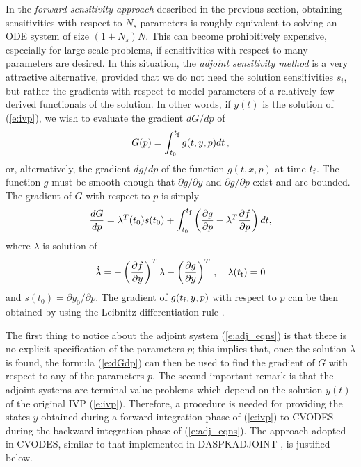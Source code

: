 In the {\em forward sensitivity approach} described in the previous
section, obtaining sensitivities with respect to $N_s$ parameters is roughly
equivalent to solving an ODE system of size $(1+N_s) N$. This can become 
prohibitively expensive, especially for large-scale problems, if sensitivities
with respect to many parameters are desired.
In this situation, the {\em adjoint sensitivity method} is a very
attractive alternative, provided that we do not need the solution sensitivities
$s_i$, but rather the gradients with respect to model parameters of a relatively 
few derived functionals of the solution. In other words, if $y(t)$ is the solution
of (\ref{e:ivp}), we wish to evaluate the gradient ${dG}/{dp}$ of
\begin{equation}\label{e:G}
G(p) = \int_{t_0}^{t_\mb{f}} g(t, y, p) dt \, ,
\end{equation}
or, alternatively, the gradient ${dg}/{dp}$ of the function $g(t, x, p)$ 
at time $t_\mb{f}$. 
The function $g$ must be smooth enough that $\partial g / \partial y$ 
and $\partial g / \partial p$ exist and are bounded. 
%
The gradient of $G$ with respect to $p$ is simply
\begin{equation}\label{e:dGdp}
  \frac{dG}{dp} = \lambda^T(t_0) s(t_0) + 
  \int_{t_0}^{t_\mb{f}} \left( \frac{\partial g}{\partial p} + 
    \lambda^T \frac{\partial f}{\partial p} \right) dt,
\end{equation}
where $\lambda$ is solution of
\begin{equation}\label{e:adj_eqns}
{\dot \lambda} = -\left( \dfdy \right)^T \lambda - 
\left( \frac{\partial g}{\partial y} \right)^T \, ,
\quad \lambda(t_\mb{f}) = 0
\end{equation}
and $s(t_0) = \partial y_0 / \partial p$.
%
The gradient of $g(t_\mb{f},y,p)$ with respect to $p$ can be then obtained
by using the Leibnitz differentiation rule \cite{CLPS:03}.

The first thing to notice about the adjoint system (\ref{e:adj_eqns})
is that there is no explicit specification of the parameters $p$; this
implies that, once the solution $\lambda$ is found, the formula
(\ref{e:dGdp}) can then be used to find the gradient of $G$ with
respect to any of the parameters $p$.
The second important remark is that the adjoint systems are terminal
value problems which depend on the solution $y(t)$ of the original IVP
(\ref{e:ivp}).  Therefore, a procedure is needed for providing the
states $y$ obtained during a forward integration phase of
(\ref{e:ivp}) to CVODES during the backward integration phase of
(\ref{e:adj_eqns}).
The approach adopted in CVODES, similar to that implemented
in DASPKADJOINT \cite{LiPe:00}, is justified below.

